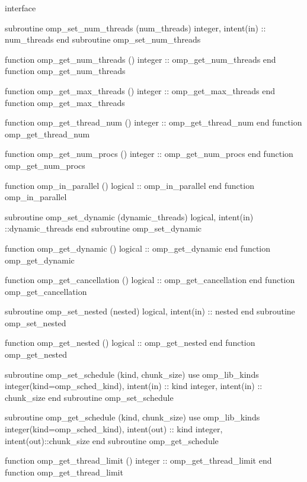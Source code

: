 {\begin{ompfFunction}
         interface

          subroutine omp_set_num_threads (num_threads)
           integer, intent(in) :: num_threads
          end subroutine omp_set_num_threads

          function omp_get_num_threads ()
           integer :: omp_get_num_threads
          end function omp_get_num_threads

          function omp_get_max_threads ()
           integer :: omp_get_max_threads
          end function omp_get_max_threads

          function omp_get_thread_num ()
           integer :: omp_get_thread_num
          end function omp_get_thread_num

          function omp_get_num_procs ()
           integer :: omp_get_num_procs
          end function omp_get_num_procs

          function omp_in_parallel ()
           logical :: omp_in_parallel
          end function omp_in_parallel

          subroutine omp_set_dynamic (dynamic_threads)
           logical, intent(in) ::dynamic_threads
          end subroutine omp_set_dynamic

          function omp_get_dynamic ()
           logical :: omp_get_dynamic
          end function omp_get_dynamic

          function omp_get_cancellation ()
           logical :: omp_get_cancellation
          end function omp_get_cancellation

          subroutine omp_set_nested (nested)
           logical, intent(in) :: nested
          end subroutine omp_set_nested

          function omp_get_nested ()
           logical :: omp_get_nested
          end function omp_get_nested

          subroutine omp_set_schedule (kind, chunk_size)
           use omp_lib_kinds
           integer(kind=omp_sched_kind), intent(in) :: kind
           integer, intent(in) :: chunk_size
          end subroutine omp_set_schedule

          subroutine omp_get_schedule (kind, chunk_size)
           use omp_lib_kinds
           integer(kind=omp_sched_kind), intent(out) :: kind
           integer, intent(out)::chunk_size
          end subroutine omp_get_schedule

          function omp_get_thread_limit ()
           integer :: omp_get_thread_limit
          end function omp_get_thread_limit


\end{ompfFunction}}
